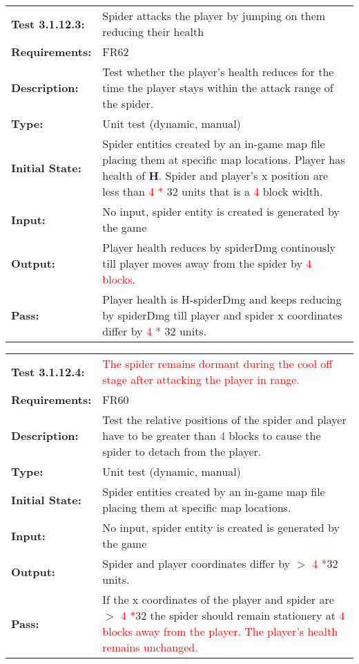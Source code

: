 \documentclass[12pt, titlepage]{article}
\begin{document}
\begin{tabular}{|l|p{10cm}|}
    \hline
    \bf{Test} 3.1.12.3: & Spider attacks the player by jumping on them reducing their health \\
    \bf{Requirements}: & FR62 \\
    \bf{Description}: & Test whether the player's health reduces for the time the player stays within the attack range of the spider.\\
    \bf{Type}:  &  Unit test (dynamic, manual)    \\
    \bf{Initial State}: & Spider entities created by an in-game map file placing them at specific map locations. Player has health of $\mathbf{H}$. Spider and player's x position are less than \textcolor{red}{4 *} 32 units that is a \textcolor{red}{4} block width. \\
    \bf{Input}: & No input, spider entity is created is generated by the game \\
    \bf{Output}: & Player health reduces by spiderDmg continously till player moves away from the spider by \textcolor{red}{4 blocks}. \\
    \bf{Pass}: & Player health is H-spiderDmg and keeps reducing by spiderDmg till player and spider x coordinates differ by \textcolor{red}{4 *} 32 units.\\
    \hline
\end{tabular}

\begin{tabular}{|l|p{10cm}|}
    \hline
    \bf{Test} 3.1.12.4: & \textcolor{red}{The spider remains dormant during the cool off stage after attacking the player in range.}\\
    \bf{Requirements}: & FR60 \\
    \bf{Description}: & Test the relative positions of the spider and player have to be greater than \textcolor{red}{4} blocks to cause the spider to detach from the player.\\
    \bf{Type}:  &  Unit test (dynamic, manual)    \\
    \bf{Initial State}: & Spider entities created by an in-game map file placing them at specific map locations.\\
    \bf{Input}: & No input, spider entity is created is generated by the game \\
    \bf{Output}: & Spider and player coordinates differ by $>$ \textcolor{red}{4 *}32 units.\\
    \bf{Pass}: & If the x coordinates of the player and spider are $>$ \textcolor{red}{4 *}32 the spider should remain stationery at \textcolor{red}{4 blocks away from the player. The player's health remains unchanged.}\\
    \hline
\end{tabular}
\end{document}
